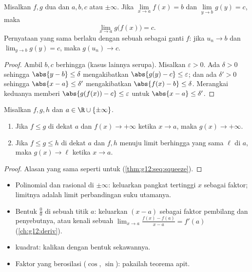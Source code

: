\begin{theorem}\label{thm:g12:limcont:composition}
Misalkan $f, g$ dua  dan $a, b, c$  atau $\pm\infty$. Jika
$\lim\limits_{x \to a} f(x) = b$ dan $\lim\limits_{y \to b} g(y) = c$, maka
\[
\lim_{x \to a} g\bigl(f(x)\bigr) = c .
\]
Pernyataan yang sama berlaku dengan sebuah  sebagai ganti $f$: jika
$u_n \to b$ dan $\lim_{y\to b} g(y) = c$, maka $g(u_n) \to c$.
\end{theorem}

\begin{proof}
Ambil $b, c$ berhingga (kasus lainnya serupa). Misalkan $\varepsilon > 0$.
Ada $\delta > 0$ sehingga $\abs{y - b} \leq \delta$ mengakibatkan
$\abs{g(y) - c} \leq \varepsilon$; dan ada $\delta' > 0$ sehingga
$\abs{x - a} \leq \delta'$ mengakibatkan $\abs{f(x) - b} \leq \delta$.
Merangkai keduanya memberi $\abs{g(f(x)) - c} \leq \varepsilon$ untuk
$\abs{x - a} \leq \delta'$.
\end{proof}

\begin{theorem}\label{thm:g12:limcont:squeeze}
Misalkan $f, g, h$  dan $a \in \R \cup \{\pm\infty\}$.
\begin{enumerate}
  \item Jika $f \leq g$ di dekat $a$ dan $f(x) \to +\infty$ ketika $x \to a$,
        maka $g(x) \to +\infty$.
  \item Jika $f \leq g \leq h$ di dekat $a$ dan $f, h$ menuju limit berhingga
        yang sama $\ell$ di $a$, maka $g(x) \to \ell$ ketika $x \to a$.
\end{enumerate}
\end{theorem}

\begin{proof}
Alasan yang sama seperti untuk  (\cref{thm:g12:seq:squeeze}).
\end{proof}

\begin{method}\label{met:g12:limcont:limits}
\begin{itemize}
  \item Polinomial dan  rasional di $\pm\infty$: keluarkan pangkat
        tertinggi $x$ sebagai faktor; limitnya adalah limit perbandingan suku
        utamanya.
  \item Bentuk $\frac{0}{0}$ di sebuah titik $a$: keluarkan $(x-a)$ sebagai
        faktor pembilang dan penyebutnya, atau kenali sebuah 
        $\lim_{x\to a}\frac{f(x)-f(a)}{x-a} = f'(a)$ (\cref{ch:g12:deriv}).
  \item {} kuadrat: kalikan dengan bentuk sekawannya.
  \item Faktor yang berosilasi ($\cos$, $\sin$): pakailah teorema apit.
\end{itemize}
\end{method}

